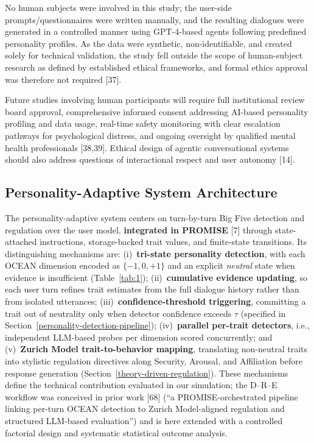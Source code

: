 No human subjects were involved in this study; the user-side prompts/questionnaires were written manually, and the resulting dialogues were generated in a controlled manner using GPT-4-based agents following predefined personality profiles. As the data were synthetic, non-identifiable, and created solely for technical validation, the study fell outside the scope of human-subject research as defined by established ethical frameworks, and formal ethics approval was therefore not required {[}37{]}.

Future studies involving human participants will require full institutional review board approval, comprehensive informed consent addressing AI-based personality profiling and data usage, real-time safety monitoring with clear escalation pathways for psychological distress, and ongoing oversight by qualified mental health professionals {[}38,39{]}. Ethical design of agentic conversational systems should also address questions of interactional respect and user autonomy {[}14{]}.

\subsection{Personality-Adaptive System Architecture}\label{personality-adaptive-system-architecture}

The personality-adaptive system centers on turn-by-turn Big Five detection and regulation over the user model, \textbf{integrated in PROMISE} {[}7{]} through state-attached instructions, storage-backed trait values, and finite-state transitions. Its distinguishing mechanisms are: (i)~\textbf{tri-state personality detection}, with each OCEAN dimension encoded as $\{-1, 0, +1\}$ and an explicit \emph{neutral} state when evidence is insufficient (Table~\ref{tab:1}); (ii)~\textbf{cumulative evidence updating}, so each user turn refines trait estimates from the full dialogue history rather than from isolated utterances; (iii)~\textbf{confidence-threshold triggering}, committing a trait out of neutrality only when detector confidence exceeds $\tau$ (specified in Section~\ref{personality-detection-pipeline}); (iv)~\textbf{parallel per-trait detectors}, i.e., independent LLM-based probes per dimension scored concurrently; and (v)~\textbf{Zurich Model trait-to-behavior mapping}, translating non-neutral traits into stylistic regulation directives along Security, Arousal, and Affiliation before response generation (Section~\ref{theory-driven-regulation}). These mechanisms define the technical contribution evaluated in our simulation; the D--R--E workflow was conceived in prior work {[}68{]} (``a PROMISE-orchestrated pipeline linking per-turn OCEAN detection to Zurich Model-aligned regulation and structured LLM-based evaluation'') and is here extended with a controlled factorial design and systematic statistical outcome analysis.

